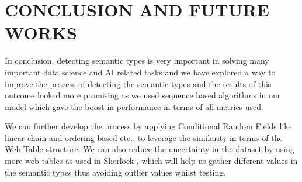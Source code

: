 \documentclass[12pt, a4paper]{report}
\theoremstyle{definition}
\numberwithin{equation}{chapter}
\numberwithin{figure}{chapter}
\numberwithin{table}{chapter}
\begin{document}
\chapter{CONCLUSION AND FUTURE WORKS}
\begin{spacing}{1.5}
\setlength{\parindent}{0em}
In conclusion, detecting semantic types is very important in solving many important data science and AI related tasks and we have explored a way to improve the process of detecting the semantic types and the results of this outcome looked more promising as we used sequence based algorithms in our model which gave the boost in performance in terms of all metrics used.
\par
\setlength{\parindent}{0em}
\setlength{\parskip}{2.2em}
We can further develop the process by applying Conditional Random Fields \cite{crf} like linear chain and ordering based etc., to leverage the similarity in terms of the Web Table structure. We can also reduce the uncertainty in the dataset by using more web tables as used in Sherlock \cite{sherlock}, which will help us gather different values in the semantic types thus avoiding outlier values whilst testing.

\end{spacing}
\newpage



\renewcommand{\bibname}{References}


\end{document}
